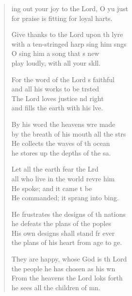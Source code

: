 \settowidth{\versewidth}{Ring out your joy to the Lord, O you just}
\begin{verse}%
  \begin{patverse}
    ing out your joy to the Lord, O yu just\\
    for praise is fitting for loyal harts.

Give thanks to the Lord upon th lyre\\
    with a ten-stringed harp sing him sngs\\
O sing him a song that \pointup{\i}s new\\
    play loudly, with all your sk\pointup{\i}ll.

For the word of the Lord \pointup{\i}s faithful\\
    and all his works to be trsted\\
The Lord loves justice nd right\\
    and fills the earth with his lve.

By his word the heavens wre made\\
    by the breath of his mouth all the strs\\
He collects the waves of th ocean\\
    he stores up the depths of the sa.

Let all the earth fear the Lrd\\
    all who live in the world revre him\\
He spoke; and it came t be\\
    He commanded; it sprang into bing.

He frustrates the designs of th nations\\
    he defeats the plans of the poples\\
His own designs shall stand fr ever\\
    the plans of his heart from age to ge.

They are happy, whose God is th Lord\\
    the people he has chosen as his wn\\
From the heavens the Lord loks forth\\
    he sees all the children of mn.


\end{patverse}
\end{verse}
